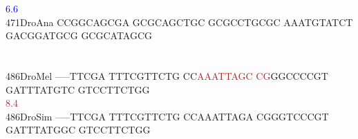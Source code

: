 \documentclass[11pt,twoside,reqno,a4paper]{article}
\begin{document}
{\hspace*{4\charwidth}\hspace*{7\charwidth}\hspace*{9\charwidth}\textcolor{Blue}{6.6}\hspace*{1\charwidth}\hspace*{1\charwidth}\hspace*{1\charwidth}\hspace*{1\charwidth}\hspace*{1\charwidth}\hspace*{1\charwidth}\\
471\hspace*{1\charwidth}DroAna	CCGGCAGCGA	GCGCAGCTGC	GCGCCTGCGC	AAATGTATCT	GACGGATGCG	GCGCATAGCG	\\
\hspace*{4\charwidth}\hspace*{7\charwidth}\hspace*{1\charwidth}\hspace*{1\charwidth}\hspace*{1\charwidth}\hspace*{1\charwidth}\hspace*{1\charwidth}\hspace*{1\charwidth}\\
\\
486\hspace*{1\charwidth}DroMel	-----TTCGA	TTTCGTTCTG	CC\textcolor{Brown}{A}\textcolor{Brown}{A}\textcolor{Brown}{A}\textcolor{Brown}{T}\textcolor{Brown}{T}\textcolor{Brown}{A}\textcolor{Brown}{G}\textcolor{Brown}{C}	\textcolor{Brown}{C}\textcolor{Brown}{G}GGCCCCGT	GATTTATGTC	GTCCTTCTGG	\\
\hspace*{4\charwidth}\hspace*{7\charwidth}\hspace*{1\charwidth}\hspace*{1\charwidth}\hspace*{22\charwidth}\textcolor{Brown}{8.4}\hspace*{1\charwidth}\hspace*{1\charwidth}\hspace*{1\charwidth}\hspace*{1\charwidth}\\
486\hspace*{1\charwidth}DroSim	-----TTCGA	TTTCGTTCTG	CCAAATTAGA	CGGGTCCCGT	GATTTATGGC	GTCCTTCTGG	\\
\hspace*{4\charwidth}\hspace*{7\charwidth}\hspace*{1\charwidth}\hspace*{1\charwidth}\hspace*{1\charwidth}\hspace*{1\charwidth}\hspace*{1\charwidth}\hspace*{1\charwidth}\\
}
\end{document}
